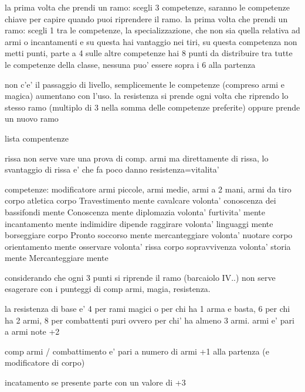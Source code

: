 \documentclass[12pt,a4paper,twoside,openany]{book}
\begin{document}
la prima volta che prendi un ramo: scegli 3 competenze, saranno le competenze chiave per capire quando puoi riprendere il ramo.
la prima volta che prendi un ramo: scegli 1 tra le competenze, la specializzazione, che non sia quella relativa ad armi o incantamenti e su questa hai vantaggio nei tiri, su questa competenza non metti punti, parte a 4
sulle altre competenze hai 8 punti da distribuire tra tutte le competenze della classe, nessuna puo' essere sopra i 6 alla partenza

non c'e' il passaggio di livello, semplicemente le competenze (compreso armi e magica) aumentano con l'uso. la resistenza si prende ogni volta che riprendo lo stesso ramo (multiplo di 3 nella somma delle competenze preferite) oppure prende un nuovo ramo

lista compentenze

rissa non serve vare una prova di comp. armi ma direttamente di rissa, lo svantaggio di rissa e' che fa poco danno
resistenza=vitalita'



competenze:													modificatore
armi piccole, armi medie, armi a 2 mani, armi da tiro		corpo
atletica													corpo
Travestimento													mente
cavalcare													volonta'	
conoscenza dei bassifondi									mente
Conoscenza														mente			
diplomazia													volonta'		
furtivita'													mente	
incantamento												mente
indimidire 													dipende		
raggirare													volonta'
linguaggi													mente
borseggiare												corpo				
Pronto soccorso													mente	
mercanteggiare 												volonta'		
nuotare 													corpo
orientamento												mente		
osservare													volonta'
rissa 														corpo		
sopravvivenza												volonta'
storia														mente	
Mercanteggiare													mente			




considerando che ogni 3 punti si riprende il ramo (barcaiolo IV..) non serve esagerare con i punteggi di comp armi, magia, resistenza.

la resistenza di base e' 4 per rami magici o per chi ha 1 arma e basta, 6 per chi ha 2 armi, 8 per combattenti puri ovvero per chi' ha almeno 3 armi. 
armi e' pari a armi note +2

comp armi / combattimento e' pari a numero di armi +1 alla partenza (e modificatore di corpo)

incatamento se presente parte con un valore di +3
\end{document}
